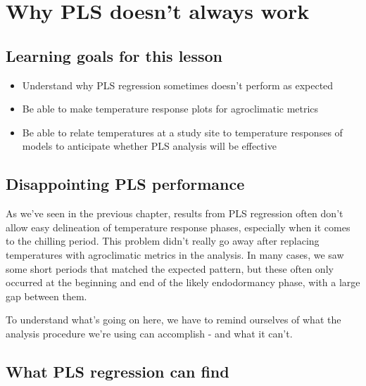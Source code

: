 \documentclass[
]{book}
\providecommand{\tightlist}{%
  \setlength{\itemsep}{0pt}\setlength{\parskip}{0pt}}
\begin{document}
\hypertarget{pls_chillforce_reflection}{%
\chapter{Why PLS doesn't always work}\label{pls_chillforce_reflection}}

\hypertarget{goals_PLS_chillforce_reflection}{%
\section*{Learning goals for this lesson}\label{goals_PLS_chillforce_reflection}}

\begin{itemize}
\tightlist
\item
  Understand why PLS regression sometimes doesn't perform as expected
\item
  Be able to make temperature response plots for agroclimatic metrics
\item
  Be able to relate temperatures at a study site to temperature responses of models to anticipate whether PLS analysis will be effective
\end{itemize}

\hypertarget{disappointing-pls-performance}{%
\section{Disappointing PLS performance}\label{disappointing-pls-performance}}

As we've seen in the previous chapter, results from PLS regression often don't allow easy delineation of temperature response phases, especially when it comes to the chilling period. This problem didn't really go away after replacing temperatures with agroclimatic metrics in the analysis. In many cases, we saw some short periods that matched the expected pattern, but these often only occurred at the beginning and end of the likely endodormancy phase, with a large gap between them.

To understand what's going on here, we have to remind ourselves of what the analysis procedure we're using can accomplish - and what it can't.

\hypertarget{what-pls-regression-can-find}{%
\section{What PLS regression can find}\label{what-pls-regression-can-find}}
\end{document}
